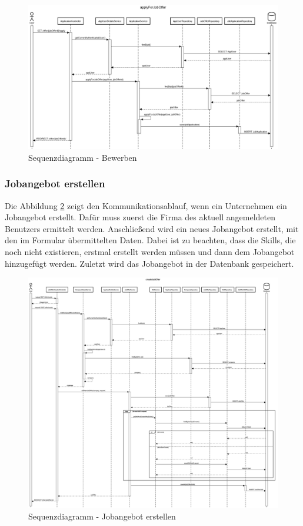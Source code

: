 \documentclass[12pt, letterpaper]{article}
\begin{document}
    \begin{figure}[h!]
        \includegraphics[width = \linewidth]{sequence/applyForJobOfferSequenzDiagramm.png}
        \caption{Sequenzdiagramm - Bewerben}
        \label{fig:Apply}
    \end{figure}

    \subsubsection{Jobangebot erstellen}

    Die Abbildung \ref{fig:CreateJobOffer} zeigt den Kommunikationsablauf, wenn ein Unternehmen ein Jobangebot erstellt. Dafür muss zuerst
    die Firma des aktuell angemeldeten Benutzers ermittelt werden. Anschließend wird ein neues Jobangebot erstellt, mit den im Formular
    übermittelten Daten. Dabei ist zu beachten, dass die Skills, die noch nicht existieren, erstmal erstellt werden müssen
    und dann dem Jobangebot hinzugefügt werden. Zuletzt wird das Jobangebot in der Datenbank gespeichert.

    \begin{figure}[h!]
        \includegraphics[width = \linewidth]{sequence/createJobOfferSequenzDiagramm.png}
        \caption{Sequenzdiagramm - Jobangebot erstellen}
        \label{fig:CreateJobOffer}
    \end{figure}
\end{document}
